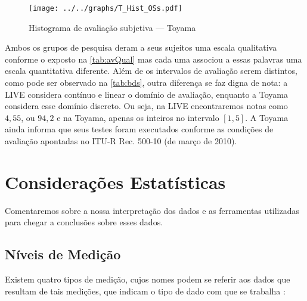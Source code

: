 \begin{figure}[htb]
	\centering
	\begin{minipage}{.8\textwidth}
		\caption{Histograma de avaliação subjetiva --- Toyama}\label{graf:toyaHist}
		\centerline{\texttt{[image: ../../graphs/T\_Hist\_OSs.pdf]}}
	\end{minipage}
\end{figure}

Ambos os grupos de pesquisa deram a seus sujeitos uma escala qualitativa conforme o exposto na \autoref{tab:avQual} mas cada uma associou a essas palavras uma escala quantitativa diferente. Além de os intervalos de avaliação serem distintos, como pode ser observado na \autoref{tab:bds}, outra diferença se faz digna de nota: a LIVE considera contínuo e linear o domínio de avaliação, enquanto a Toyama considera esse domínio discreto. Ou seja, na LIVE encontraremos notas como $4,55$, ou $94,2$ e na Toyama, apenas os inteiros no intervalo $[1,5]$. A Toyama ainda informa que seus testes foram executados conforme as condições de avaliação apontadas no ITU-R Rec. 500-10 (de março de 2010). 

\section{Considerações Estatísticas}

Comentaremos sobre a nossa interpretação dos dados e as ferramentas utilizadas para chegar a conclusões sobre esses dados.

\subsection{Níveis de Medição}

Existem quatro tipos de medição, cujos nomes podem se referir aos dados que resultam de tais medições, que indicam o tipo de dado com que se trabalha \cite[p.02-04]{boslaugh2008}:

